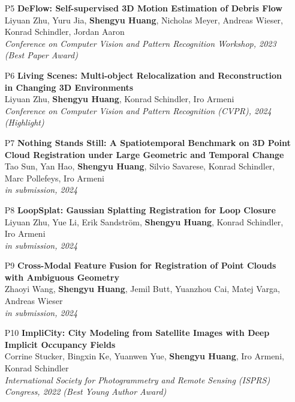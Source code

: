 \begin{itemize}    

    \item [P5] \noindent\textbf{ DeFlow: Self-supervised 3D Motion Estimation of Debris Flow} \\[0.5em]
    Liyuan Zhu, Yuru Jia, \textbf{Shengyu Huang}, Nicholas Meyer, Andreas Wieser, Konrad Schindler, Jordan Aaron \\
    \textit{Conference on Computer Vision and Pattern Recognition Workshop, 2023 (Best Paper Award)}
    
    \item [P6] \noindent\textbf{ Living Scenes: Multi-object Relocalization and Reconstruction in Changing 3D Environments} \\[0.5em]
    Liyuan Zhu, \textbf{Shengyu Huang}, Konrad Schindler, Iro Armeni \\
    \textit{Conference on Computer Vision and Pattern Recognition (CVPR), 2024 (Highlight)}
    
    \item [P7] \noindent\textbf{ Nothing Stands Still: A Spatiotemporal Benchmark on 3D Point Cloud Registration under Large Geometric and Temporal Change} \\[0.5em]
    Tao Sun, Yan Hao, \textbf{Shengyu Huang}, Silvio Savarese, Konrad Schindler, Marc Pollefeys, Iro Armeni \\
    \textit{in submission, 2024}

    \item [P8] \noindent\textbf{ LoopSplat: Gaussian Splatting Registration for Loop Closure} \\[0.5em]
    Liyuan Zhu, Yue Li, Erik Sandström, \textbf{Shengyu Huang}, Konrad Schindler, Iro Armeni \\
    \textit{in submission, 2024}
    
    \item [P9] \noindent\textbf{ Cross-Modal Feature Fusion for Registration of Point Clouds with Ambiguous Geometry} \\[0.5em]
    Zhaoyi Wang, \textbf{Shengyu Huang}, Jemil Butt, Yuanzhou Cai, Matej Varga, Andreas Wieser \\
    \textit{in submission, 2024}

    \item [P10] \noindent\textbf{ ImpliCity: City Modeling from Satellite Images with Deep Implicit Occupancy Fields} \\[0.5em]
    Corrine Stucker, Bingxin Ke, Yuanwen Yue, \textbf{Shengyu Huang}, Iro Armeni, Konrad Schindler \\
    \textit{International Society for Photogrammetry and Remote Sensing (ISPRS) Congress, 2022 (Best Young Author Award)}
    

\end{itemize}
